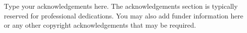 
\begin{acknowledgements}

Type your acknowledgements here. The acknowledgements section is typically
reserved for professional dedications. You may also add funder information
here or any other copyright acknowledgements that may be required.

\end{acknowledgements}
